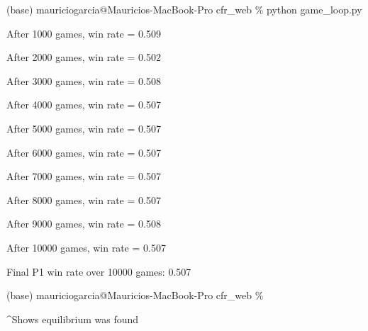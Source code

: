 \documentclass[
]{article}
\begin{document}
(base) mauriciogarcia@Mauricios-MacBook-Pro cfr\_web \% python
game\_loop.py

After 1000 games, win rate = 0.509

After 2000 games, win rate = 0.502

After 3000 games, win rate = 0.508

After 4000 games, win rate = 0.507

After 5000 games, win rate = 0.507

After 6000 games, win rate = 0.507

After 7000 games, win rate = 0.507

After 8000 games, win rate = 0.507

After 9000 games, win rate = 0.508

After 10000 games, win rate = 0.507

Final P1 win rate over 10000 games: 0.507

(base) mauriciogarcia@Mauricios-MacBook-Pro cfr\_web \%

\^{}Shows equilibrium was found
\end{document}
